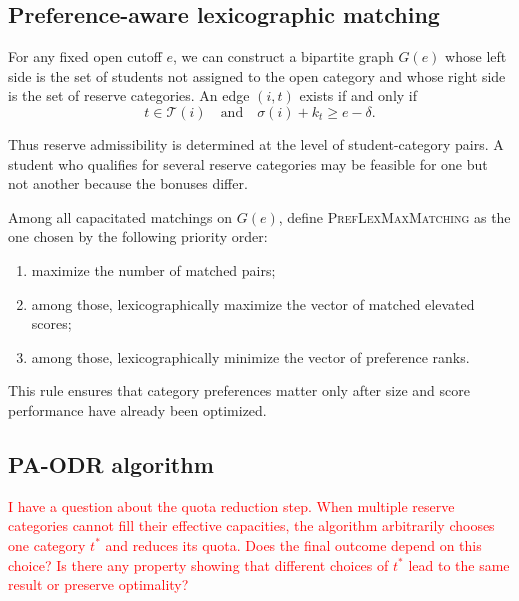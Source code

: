 \documentclass[12pt]{article}
\newcommand{\T}{\mathcal{T}}
\newcommand{\1}{\mathbf{1}}
\begin{document}
\subsection{Preference-aware lexicographic matching}

For any fixed open cutoff $e$, we can construct a bipartite graph $G(e)$ whose left side is the set of students not assigned to the open category and whose right side is the set of reserve categories. An edge $(i,t)$ exists if and only if
\[
t\in\T(i)\quad\text{and}\quad \sigma(i)+k_t\ge e-\delta.
\]

Thus reserve admissibility is determined at the level of student-category pairs. A student who qualifies for several reserve categories may be feasible for one but not another because the bonuses differ.

Among all capacitated matchings on $G(e)$, define \textsc{PrefLexMaxMatching} as the one chosen by the following priority order:
\begin{enumerate}
\item maximize the number of matched pairs;
\item among those, lexicographically maximize the vector of matched elevated scores;
\item among those, lexicographically minimize the vector of preference ranks.
\end{enumerate}

This rule ensures that category preferences matter only after size and score performance have already been optimized.

\subsection{PA-ODR algorithm}

\textcolor{red}{I have a question about the quota reduction step. When multiple reserve categories cannot fill their effective capacities, the algorithm arbitrarily chooses one category $t^\ast$ and reduces its quota. Does the final outcome depend on this choice? Is there any property showing that different choices of $t^\ast$ lead to the same result or preserve optimality?}
\end{document}
